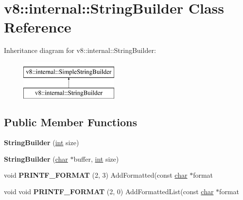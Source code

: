 \hypertarget{classv8_1_1internal_1_1StringBuilder}{}\section{v8\+:\+:internal\+:\+:String\+Builder Class Reference}
\label{classv8_1_1internal_1_1StringBuilder}
Inheritance diagram for v8\+:\+:internal\+:\+:String\+Builder\+:\begin{figure}[H]
\begin{center}
\leavevmode
\includegraphics[height=2.000000cm]{classv8_1_1internal_1_1StringBuilder}
\end{center}
\end{figure}
\subsection*{Public Member Functions}
\begin{DoxyCompactItemize}
\item 
\mbox{\label{classv8_1_1internal_1_1StringBuilder_a9bf748d9a19f14ade28d2f0d3367d1f7}} 
{\bfseries String\+Builder} (\mbox{\hyperlink{classint}{int}} size)
\item 
\mbox{\label{classv8_1_1internal_1_1StringBuilder_ae084684be6d4361af9a5d1b8de2ff16d}} 
{\bfseries String\+Builder} (\mbox{\hyperlink{classchar}{char}} $\ast$buffer, \mbox{\hyperlink{classint}{int}} size)
\item 
\mbox{\label{classv8_1_1internal_1_1StringBuilder_a5823898923ae9c988a0b8073396ab162}} 
void {\bfseries P\+R\+I\+N\+T\+F\+\_\+\+F\+O\+R\+M\+AT} (2, 3) Add\+Formatted(const \mbox{\hyperlink{classchar}{char}} $\ast$format
\item 
\mbox{\label{classv8_1_1internal_1_1StringBuilder_a80ef5067c51aaa36ab53be62a99fc007}} 
void void {\bfseries P\+R\+I\+N\+T\+F\+\_\+\+F\+O\+R\+M\+AT} (2, 0) Add\+Formatted\+List(const \mbox{\hyperlink{classchar}{char}} $\ast$format
\end{DoxyCompactItemize}
